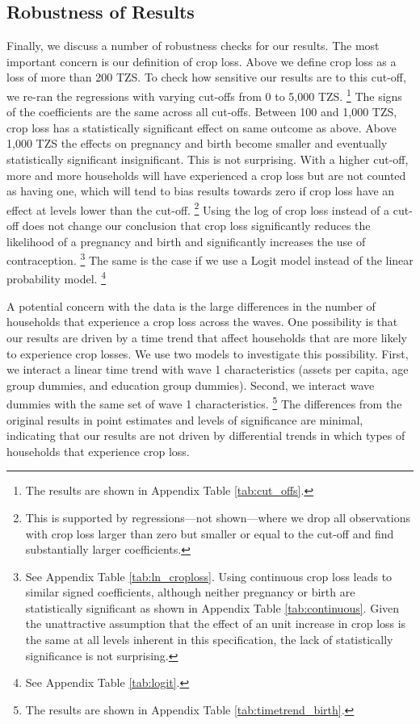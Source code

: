 \documentclass[letterpaper,12pt]{article}
\begin{document}
\subsection{Robustness of Results\label{sec:robustness}}

Finally, we discuss a number of robustness checks for our results.
The most important concern is our definition of crop loss.
Above we define crop loss as a loss of more than 200 TZS.
To check how sensitive our results are to this cut-off,
we re-ran the regressions with varying cut-offs from 
0 to 5,000 TZS.%
\footnote{
The results are shown in Appendix Table \ref{tab:cut_offs}.
}
The signs of the coefficients are the same across all cut-offs.
Between 100 and 1,000 TZS, crop loss has a statistically significant
effect on same outcome as above.
Above 1,000 TZS the effects on pregnancy and birth become smaller and 
eventually statistically significant insignificant.
This is not surprising.
With a higher cut-off, more and more households will have experienced 
a crop loss but are not counted as having one, which will tend to 
bias results towards zero if crop loss have an effect at levels 
lower than the cut-off.%
\footnote{
This is supported by regressions---not shown---where we drop all observations 
with crop loss larger than zero but smaller or equal to the cut-off and find 
substantially larger coefficients.
} 
Using the log of crop loss instead of a cut-off does
not change our conclusion that crop loss significantly reduces
the likelihood of a pregnancy and birth and significantly
increases the use of contraception.%
\footnote{
See Appendix Table \ref{tab:ln_croploss}.
Using continuous crop loss leads to similar signed coefficients,
although neither pregnancy or birth are statistically significant
as shown in Appendix Table \ref{tab:continuous}.
Given the unattractive assumption that the effect of an unit
increase in crop loss is the same at all levels inherent in
this specification, the lack of statistically significance is
not surprising. 
}
The same is the case if we use a Logit model instead of the
linear probability model.%
\footnote{
See Appendix Table \ref{tab:logit}.
}

A potential concern with the data is the large differences in
the number of households that experience a crop loss across
the waves.
One possibility is that our results are driven by a time
trend that affect households that are more likely to
experience crop losses.
We use two models to investigate this possibility.
First, we interact a linear time trend with wave 1 characteristics 
(assets per capita, age group dummies, and education group dummies).
Second, we interact wave dummies with the same set of wave 1 
characteristics.%
\footnote{
The results are shown in Appendix Table \ref{tab:timetrend_birth}.
}
The differences from the original results in point estimates 
and levels of significance are minimal, indicating that 
our results are not driven by differential trends in which 
types of households that experience crop loss.
\end{document}
